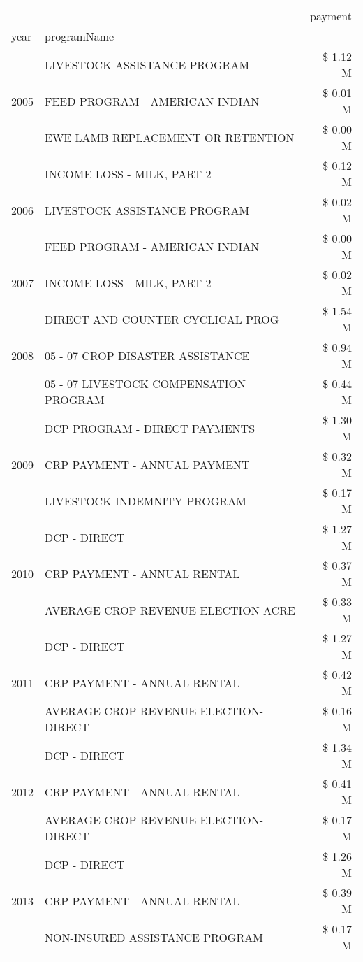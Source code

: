 \begin{tabular}{llr}
\toprule
 &  & payment \\
year & programName &  \\
\midrule
\multirow[t]{3}{*}{2005} & LIVESTOCK ASSISTANCE PROGRAM & \$ 1.12 M \\
 & FEED PROGRAM - AMERICAN INDIAN & \$ 0.01 M \\
 & EWE LAMB REPLACEMENT OR RETENTION & \$ 0.00 M \\
\cline{1-3}
\multirow[t]{3}{*}{2006} & INCOME LOSS - MILK, PART 2 & \$ 0.12 M \\
 & LIVESTOCK ASSISTANCE PROGRAM & \$ 0.02 M \\
 & FEED PROGRAM - AMERICAN INDIAN & \$ 0.00 M \\
\cline{1-3}
2007 & INCOME LOSS - MILK, PART 2 & \$ 0.02 M \\
\cline{1-3}
\multirow[t]{3}{*}{2008} & DIRECT AND COUNTER CYCLICAL PROG & \$ 1.54 M \\
 & 05 - 07 CROP DISASTER ASSISTANCE & \$ 0.94 M \\
 & 05 - 07 LIVESTOCK COMPENSATION PROGRAM & \$ 0.44 M \\
\cline{1-3}
\multirow[t]{3}{*}{2009} & DCP PROGRAM - DIRECT PAYMENTS & \$ 1.30 M \\
 & CRP PAYMENT - ANNUAL PAYMENT & \$ 0.32 M \\
 & LIVESTOCK INDEMNITY PROGRAM & \$ 0.17 M \\
\cline{1-3}
\multirow[t]{3}{*}{2010} & DCP - DIRECT & \$ 1.27 M \\
 & CRP PAYMENT - ANNUAL RENTAL & \$ 0.37 M \\
 & AVERAGE CROP REVENUE ELECTION-ACRE & \$ 0.33 M \\
\cline{1-3}
\multirow[t]{3}{*}{2011} & DCP - DIRECT & \$ 1.27 M \\
 & CRP PAYMENT - ANNUAL RENTAL & \$ 0.42 M \\
 & AVERAGE CROP REVENUE ELECTION-DIRECT & \$ 0.16 M \\
\cline{1-3}
\multirow[t]{3}{*}{2012} & DCP - DIRECT & \$ 1.34 M \\
 & CRP PAYMENT - ANNUAL RENTAL & \$ 0.41 M \\
 & AVERAGE CROP REVENUE ELECTION-DIRECT & \$ 0.17 M \\
\cline{1-3}
\multirow[t]{3}{*}{2013} & DCP - DIRECT & \$ 1.26 M \\
 & CRP PAYMENT - ANNUAL RENTAL & \$ 0.39 M \\
 & NON-INSURED ASSISTANCE PROGRAM & \$ 0.17 M \\

\end{tabular}
